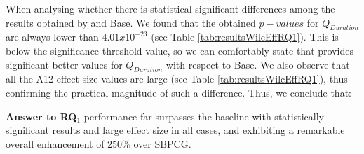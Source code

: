 When analysing whether there is statistical significant differences among the results obtained by \simhotep{} and Base. We found that the obtained $p-values$ for $Q_{Duration}$ are always lower than $4.01x10^{-23}$  (see Table \ref{tab:resultsWilcEffRQ1}). This is below the significance threshold value, so we can comfortably state that \simhotep{} provides significant better values for $Q_{Duration}$ with respect to Base. We also observe that all the  A12 effect size values are large (see Table \ref{tab:resultsWilcEffRQ1}), thus confirming the practical magnitude of such a difference. Thus, we conclude that:

\noindent \textbf{Answer to RQ$_1$} \simhotep{} performance far surpasses the baseline with statistically significant results and large effect size in all cases, and exhibiting a remarkable overall enhancement of 250\% over SBPCG.

